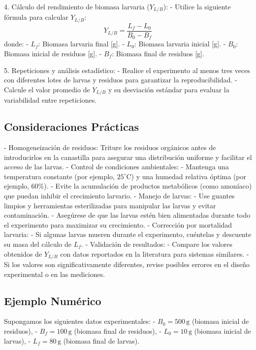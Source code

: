 \documentclass[12pt]{article}
\begin{document}
4. Cálculo del rendimiento de biomasa larvaria ($Y_{L/B}$):
   - Utilice la siguiente fórmula para calcular $Y_{L/B}$:
     \[
     Y_{L/B} = \frac{L_f - L_0}{B_0 - B_f}
     \]
     donde:
     - $L_f$: Biomasa larvaria final [g].
     - $L_0$: Biomasa larvaria inicial [g].
     - $B_0$: Biomasa inicial de residuos [g].
     - $B_f$: Biomasa final de residuos [g].

5. Repeticiones y análisis estadístico:
   - Realice el experimento al menos tres veces con diferentes lotes de larvas y residuos para garantizar la reproducibilidad.
   - Calcule el valor promedio de $Y_{L/B}$ y su desviación estándar para evaluar la variabilidad entre repeticiones.

\subsection{Consideraciones Prácticas}

- Homogeneización de residuos: Triture los residuos orgánicos antes de introducirlos en la canastilla para asegurar una distribución uniforme y facilitar el acceso de las larvas.
- Control de condiciones ambientales:
  - Mantenga una temperatura constante (por ejemplo, $25^\circ \text{C}$) y una humedad relativa óptima (por ejemplo, $60\%$).
  - Evite la acumulación de productos metabólicos (como amoníaco) que puedan inhibir el crecimiento larvario.
- Manejo de larvas:
  - Use guantes limpios y herramientas esterilizadas para manipular las larvas y evitar contaminación.
  - Asegúrese de que las larvas estén bien alimentadas durante todo el experimento para maximizar su crecimiento.
- Corrección por mortalidad larvaria:
  - Si algunas larvas mueren durante el experimento, cuéntelas y descuente su masa del cálculo de $L_f$.
- Validación de resultados:
  - Compare los valores obtenidos de $Y_{L/B}$ con datos reportados en la literatura para sistemas similares.
  - Si los valores son significativamente diferentes, revise posibles errores en el diseño experimental o en las mediciones.

\subsection{Ejemplo Numérico}

Supongamos los siguientes datos experimentales:
- $B_0 = 500 \, \text{g}$ (biomasa inicial de residuos),
- $B_f = 100 \, \text{g}$ (biomasa final de residuos),
- $L_0 = 10 \, \text{g}$ (biomasa inicial de larvas),
- $L_f = 80 \, \text{g}$ (biomasa final de larvas).
\end{document}
